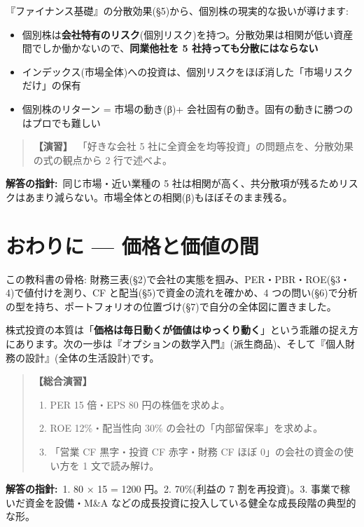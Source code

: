 \documentclass{article}
\begin{document}
『ファイナンス基礎』の分散効果(§5)から、個別株の現実的な扱いが導けます:
\begin{itemize}
\item 個別株は\textbf{会社特有のリスク}(個別リスク)を持つ。分散効果は相関が低い資産間でしか働かないので、\textbf{同業他社を 5 社持っても分散にはならない}
\item インデックス(市場全体)への投資は、個別リスクをほぼ消した「市場リスクだけ」の保有
\item 個別株のリターン = 市場の動き(β)+ 会社固有の動き。固有の動きに勝つのはプロでも難しい
\end{itemize}

\begin{quote}
\textbf{【演習】}\ 「好きな会社 5 社に全資金を均等投資」の問題点を、分散効果の式の観点から 2 行で述べよ。
\end{quote}

\textbf{解答の指針:}\ 同じ市場・近い業種の 5 社は相関が高く、共分散項が残るためリスクはあまり減らない。市場全体との相関(β)もほぼそのまま残る。

\section{おわりに — 価格と価値の間}

この教科書の骨格: 財務三表(§2)で会社の実態を掴み、PER・PBR・ROE(§3・4)で値付けを測り、CF と配当(§5)で資金の流れを確かめ、4 つの問い(§6)で分析の型を持ち、ポートフォリオの位置づけ(§7)で自分の全体図に置きました。

株式投資の本質は「\textbf{価格は毎日動くが価値はゆっくり動く}」という乖離の捉え方にあります。次の一歩は『オプションの数学入門』(派生商品)、そして『個人財務の設計』(全体の生活設計)です。

\begin{quote}
\textbf{【総合演習】}
\begin{enumerate}
\item PER 15 倍・EPS 80 円の株価を求めよ。
\item ROE 12\%・配当性向 30\% の会社の「内部留保率」を求めよ。
\item 「営業 CF 黒字・投資 CF 赤字・財務 CF ほぼ 0」の会社の資金の使い方を 1 文で読み解け。
\end{enumerate}
\end{quote}

\textbf{解答の指針:}\ 1. 80 × 15 = 1200 円。2. 70\%(利益の 7 割を再投資)。3. 事業で稼いだ資金を設備・M\&A などの成長投資に投入している健全な成長段階の典型的な形。
\end{document}
